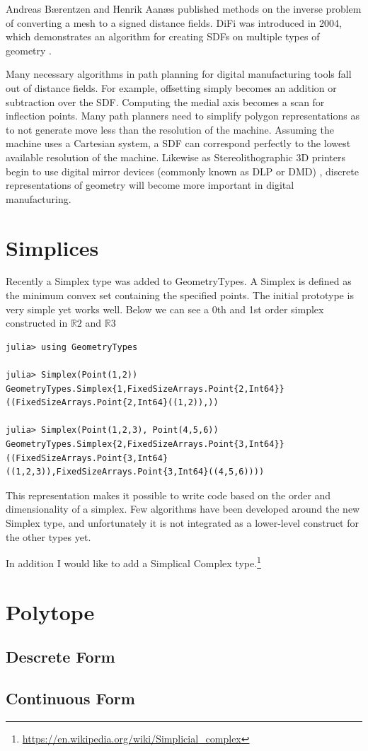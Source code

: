 
Andreas Bærentzen and Henrik Aanæs published methods on the inverse
problem of converting a mesh to a signed distance fields.\cite{Baerentzen_Aanaes}
DiFi was introduced in 2004, which demonstrates an algorithm for creating
SDFs on multiple types of geometry \cite{Sud_Otaduy_Manocha_2004}.

Many necessary algorithms in path planning for digital manufacturing tools
fall out of distance fields. For example, offsetting simply becomes
an addition or subtraction over the SDF. Computing the medial axis becomes
a scan for inflection points. Many path planners need to simplify polygon
representations as to not generate move less than the resolution of the machine.
Assuming the machine uses a Cartesian system, a SDF can correspond perfectly
to the lowest available resolution of the machine.
Likewise as Stereolithographic 3D printers
begin to use digital mirror devices (commonly known as DLP or DMD)
, discrete representations of geometry will become more important in
digital manufacturing.

\cite{Pasko_Adzhiev_Comninos_2008}

\section{Simplices}

Recently a Simplex type was added to GeometryTypes. A Simplex is defined
as the minimum convex set containing the specified points. The initial
prototype is very simple yet works well. Below we can see a 0th and 1st order
simplex constructed in $\mathbb{R}2$ and $\mathbb{R}3$
\begin{lstlisting}
julia> using GeometryTypes

julia> Simplex(Point(1,2))
GeometryTypes.Simplex{1,FixedSizeArrays.Point{2,Int64}}((FixedSizeArrays.Point{2,Int64}((1,2)),))

julia> Simplex(Point(1,2,3), Point(4,5,6))
GeometryTypes.Simplex{2,FixedSizeArrays.Point{3,Int64}}((FixedSizeArrays.Point{3,Int64}((1,2,3)),FixedSizeArrays.Point{3,Int64}((4,5,6))))
\end{lstlisting}

This representation makes it possible to write code based on the order and
dimensionality of a simplex. Few algorithms have been developed around the
new Simplex type, and unfortunately it is not integrated as a lower-level
construct for the other types yet.

In addition I would like to add a Simplical Complex type.\footnote{\url{https://en.wikipedia.org/wiki/Simplicial_complex}}


\section{Polytope}

\subsection{Descrete Form}


\subsection{Continuous Form}
